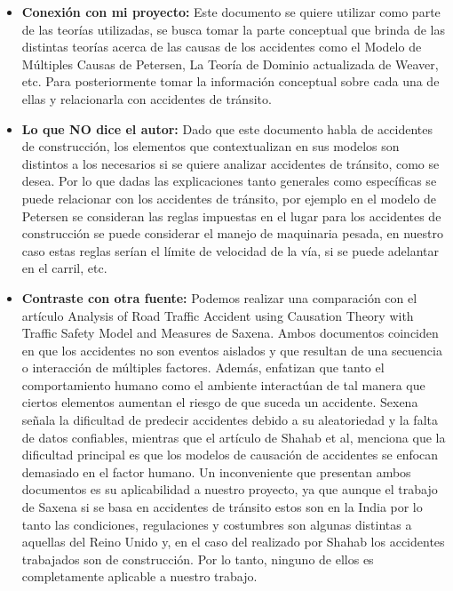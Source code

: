 \documentclass[12pt]{article}
\begin{document}
\begin{itemize}
    \item \textbf{Conexión con mi proyecto:}  Este documento se quiere utilizar 
    como parte de las teorías utilizadas, se busca tomar la parte conceptual que 
    brinda de las distintas teorías acerca de las causas de los accidentes como 
    el Modelo de Múltiples Causas de Petersen, La Teoría de Dominio actualizada 
    de Weaver, etc. Para posteriormente tomar la información conceptual sobre 
    cada una de ellas y relacionarla con accidentes de tránsito.
    
	\item \textbf{Lo que NO dice el autor:}  Dado que este documento habla de accidentes de 
	construcción, los elementos que contextualizan en sus modelos son distintos a 
	los necesarios si se quiere analizar accidentes de tránsito, como se desea. 
	Por lo que dadas las explicaciones tanto generales como específicas se puede 
	relacionar con los accidentes de tránsito, por ejemplo en el modelo de Petersen 
	se consideran las reglas impuestas en el lugar para los accidentes de construcción 
	se puede considerar el manejo de maquinaria pesada, en nuestro caso estas reglas 
	serían el límite de velocidad de la vía, si se puede adelantar en el carril, etc. 
	
	\item \textbf{Contraste con otra fuente:}  Podemos realizar una comparación con el 
	artículo Analysis of Road Traffic Accident using Causation Theory with Traffic 
	Safety Model and Measures de Saxena. Ambos documentos coinciden en que los accidentes 
	no son eventos aislados y que resultan de una secuencia o interacción de múltiples 
	factores. Además, enfatizan que tanto el comportamiento humano como el ambiente 
	interactúan de tal manera que ciertos elementos aumentan el riesgo de que suceda 
	un accidente. Sexena señala la dificultad de predecir accidentes debido a su aleatoriedad 
	y la falta de datos confiables, mientras que el artículo de Shahab et al, menciona que 
	la dificultad principal es que los modelos de causación de accidentes se enfocan demasiado 
	en el factor humano. Un inconveniente que presentan ambos documentos es su aplicabilidad
	a nuestro proyecto, ya que aunque el trabajo de Saxena si se basa en accidentes de 
	tránsito estos son en la India por lo tanto las condiciones, regulaciones y costumbres 
	son algunas distintas a aquellas del Reino Unido y, en el caso del realizado por Shahab 
	los accidentes trabajados son de construcción. Por lo tanto, ninguno de ellos es completamente aplicable a nuestro trabajo. 
	

\end{itemize}
\end{document}
